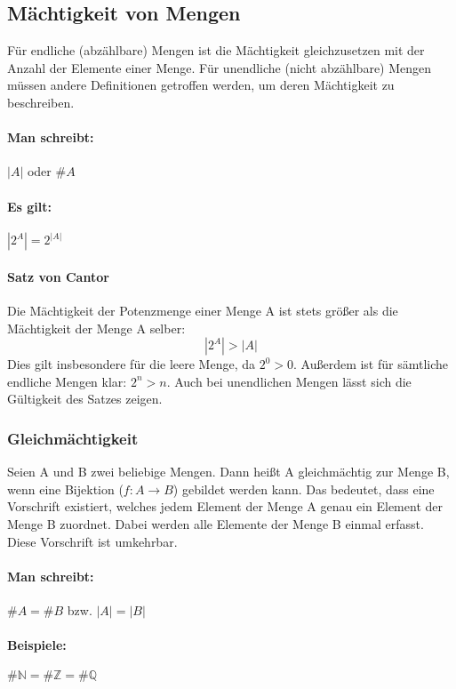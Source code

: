 \subsection{Mächtigkeit von Mengen}
Für endliche (abzählbare) Mengen ist die Mächtigkeit gleichzusetzen mit der Anzahl
der Elemente einer Menge. Für unendliche (nicht abzählbare) Mengen müssen andere
Definitionen getroffen werden, um deren Mächtigkeit zu beschreiben.
\paragraph{Man schreibt:}
\({}|{}A{}|{}\) oder \(\#A\)
\paragraph{Es gilt:}
\begin{math}
{}|{}2^A{}|{} = 2^{{}|{}A{}|{}}
\end{math}

\paragraph{Satz von Cantor}
Die Mächtigkeit der Potenzmenge einer Menge A ist stets größer als die Mächtigkeit der Menge A selber:
$$ |2^A| > |A| $$
Dies gilt insbesondere für die leere Menge, da $2^0>0$.
Außerdem ist für sämtliche endliche Mengen klar: $ 2^n > n $.  Auch bei unendlichen Mengen lässt sich die Gültigkeit des Satzes zeigen.

\subsubsection*{Gleichmächtigkeit}
Seien A und B zwei beliebige Mengen.
Dann heißt A gleichmächtig zur Menge B, wenn eine Bijektion (\({f:A}\rightarrow{B}\)) gebildet
werden kann. Das bedeutet, dass eine Vorschrift existiert, welches
jedem Element der Menge A genau ein Element der Menge B zuordnet.
Dabei werden alle Elemente der Menge B einmal erfasst. Diese
Vorschrift ist umkehrbar.
\paragraph{Man schreibt:} \(\#A = \#B\) bzw. \(|A| = |B|\)
\paragraph*{Beispiele:}
\begin{math}
\#{\mathbb N} = \#{\mathbb Z} = \#{\mathbb Q}
\end{math}

